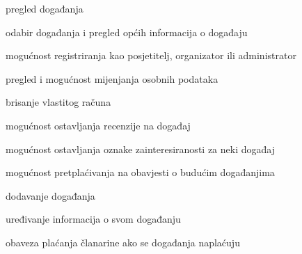 			
			\begin{packed_enum}
				\item  {}
				
				\begin{packed_enum}
					
					\item pregled događanja
					\item odabir događanja i pregled općih informacija o događaju
					\item mogućnost registriranja kao posjetitelj, organizator ili administrator
					
				\end{packed_enum}
				
				\item  {}
				
				\begin{packed_enum}
					
					\item pregled i mogućnost mijenjanja osobnih podataka
					\item brisanje vlastitog računa
					\item mogućnost ostavljanja recenzije na događaj
					\item mogućnost ostavljanja oznake zainteresiranosti za neki događaj
					\item mogućnost pretplaćivanja na obavjesti o budućim događanjima
					
					
				\end{packed_enum}
				
				\item  {}
				
				\begin{packed_enum}
									
					\item dodavanje događanja
					\item uređivanje informacija o svom događanju
					\item obaveza plaćanja članarine ako se događanja naplaćuju
					
					
				\end{packed_enum}
				
				\item  {}
				
				\begin{packed_enum}	
					

\end{packed_enum}
\end{packed_enum}
